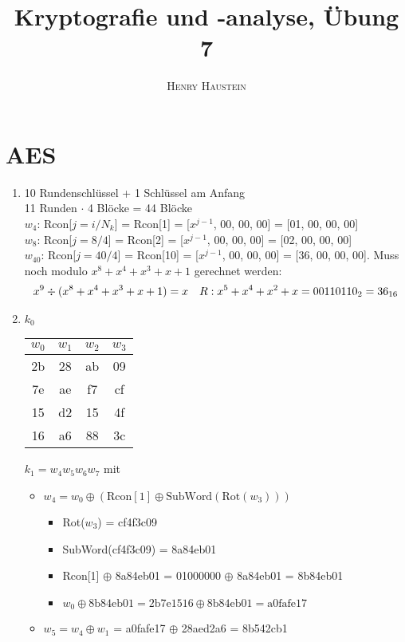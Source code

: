 \documentclass{article}
\title{\textbf{Kryptografie und -analyse, Übung 7}}
\author{\textsc{Henry Haustein}}
\date{}
\begin{document}
	\maketitle

	\section*{AES}
	\begin{enumerate}[label=(\alph*)]
		\item 10 Rundenschlüssel + 1 Schlüssel am Anfang \\
		11 Runden $\cdot$ 4 Blöcke = 44 Blöcke \\
		$w_4$: Rcon[$j=i/N_k$] = Rcon[1] = [$x^{j-1}$, 00, 00, 00] = [01, 00, 00, 00] \\
		$w_8$: Rcon[$j=8/4$] = Rcon[2] = [$x^{j-1}$, 00, 00, 00] = [02, 00, 00, 00] \\
		$w_{40}$: Rcon[$j=40/4$] = Rcon[10] = [$x^{j-1}$, 00, 00, 00] = [36, 00, 00, 00]. Muss noch modulo $x^8+x^4+x^3+x+1$ gerechnet werden:
		\begin{align}
			x^9 \div (x^8+x^4+x^3+x+1) = x \quad R: x^5+x^4+x^2+x = 00110110_2 = 36_{16} \notag
		\end{align}
		\item $k_0$
		\begin{center}
			\begin{tabular}{c|c|c|c}
				$w_0$ & $w_1$ & $w_2$ & $w_3$ \\
				\hline
				2b & 28 & ab & 09 \\
				7e & ae & f7 & cf  \\
				15 & d2 & 15 & 4f \\
				16 & a6 & 88 & 3c
			\end{tabular}
		\end{center}
		$k_1 = w_4w_5w_6w_7$ mit
		\begin{itemize}
			\item $w_4 = w_0 \oplus (\text{Rcon}[1] \oplus \text{SubWord}(\text{Rot}(w_3)))$
			\begin{itemize}
				\item Rot($w_3$) = cf4f3c09
				\item SubWord(cf4f3c09) = 8a84eb01
				\item Rcon[1] $\oplus$ 8a84eb01 = 01000000 $\oplus$ 8a84eb01 = 8b84eb01
				\item $w_0 \oplus \text{8b84eb01} = \text{2b7e1516} \oplus \text{8b84eb01} = \text{a0fafe17}$
			\end{itemize}
			\item $w_5 = w_4 \oplus w_1$ = a0fafe17 $\oplus$ 28aed2a6 = 8b542cb1

\end{itemize}
\end{enumerate}
\end{document}
